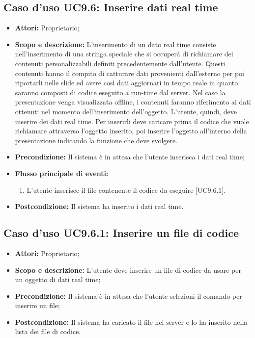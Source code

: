 \subsection{Caso d'uso UC9.6: Inserire dati real time}
\begin{itemize}
	\item \textbf{Attori:} Proprietario;
	\item \textbf{Scopo e descrizione:}	L'inserimento di un dato \gls{real time} consiste nell'inserimento di una stringa speciale che si occuperà di richiamare dei contenuti personalizzabili definiti precedentemente dall'utente. Questi contenuti hanno il compito di catturare dati provenienti dall'esterno per poi riportarli nelle \gls{slide} ed avere così dati aggiornati in tempo reale in quanto saranno composti di codice eseguito a run-time dal server. Nel caso la presentazione venga visualizzata offline, i contenuti faranno riferimento ai dati ottenuti nel momento dell'inserimento dell'oggetto.
	L'utente, quindi, deve inserire dei dati \gls{real time}. Per inserirli deve caricare prima il codice che vuole richiamare attraverso l'oggetto inserito, poi inserire l'oggetto all'interno della presentazione indicando la funzione che deve svolgere.
	
	\item \textbf{Precondizione:} Il sistema è in attesa che l'utente inserisca i dati \gls{real time};
	\item \textbf{Flusso principale di eventi:}
	\begin{enumerate}
		\item L'utente inserisce il file contenente il codice da eseguire [UC9.6.1].
	\end{enumerate}
	\item \textbf{Postcondizione:} Il sistema ha inserito i dati \gls{real time}.
\end{itemize}

	\subsection{Caso d'uso UC9.6.1: Inserire un file di codice}
	\begin{itemize}
		\item \textbf{Attori:} Proprietario;
		\item \textbf{Scopo e descrizione:} L'utente deve inserire un file di codice da usare per un oggetto di dati \gls{real time};
		\item \textbf{Precondizione:} Il sistema è in attesa che l'utente selezioni il comando per inserire un file;
		\item \textbf{Postcondizione:} Il sistema ha caricato il file nel server e lo ha inserito nella lista dei file di codice.
	\end{itemize}
	

